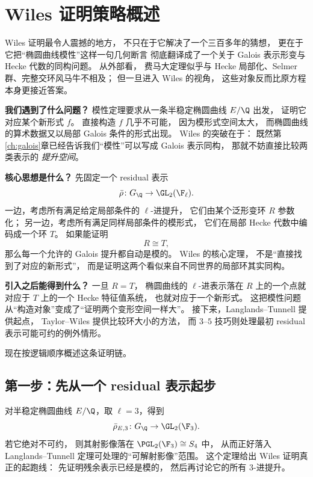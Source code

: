 \section{Wiles 证明策略概述}
\label{sec:ch10-wiles-strategy}

\providecommand{\rhobar}{\bar{\rho}}
\providecommand{\Sel}{\operatorname{Sel}}

Wiles 证明最令人震撼的地方，
不只在于它解决了一个三百多年的猜想，
更在于它把“椭圆曲线模性”这样一句几何断言
彻底翻译成了一个关于 Galois 表示形变与 Hecke 代数的同构问题。
从外部看，
费马大定理似乎与 Hecke 局部化、Selmer 群、完整交环风马牛不相及；
但一旦进入 Wiles 的视角，
这些对象反而比原方程本身更接近答案。

\textbf{我们遇到了什么问题？}
模性定理要求从一条半稳定椭圆曲线 $E/\Q$ 出发，
证明它对应某个新形式 $f$。
直接构造 $f$ 几乎不可能，
因为模形式空间太大，
而椭圆曲线的算术数据又以局部 Galois 条件的形式出现。
Wiles 的突破在于：
既然第\ref{ch:galois}章已经告诉我们“模性”可以写成 Galois 表示同构，
那就不妨直接比较两类表示的 \emph{提升空间}。

\textbf{核心思想是什么？}
先固定一个 residual 表示
\[
  \rhobar\colon G_\Q\to \GL_2(\F_\ell).
\]
一边，考虑所有满足给定局部条件的 $\ell$-进提升，
它们由某个泛形变环 $R$ 参数化；
另一边，考虑所有满足同样局部条件的模形式，
它们在局部 Hecke 代数中编码成一个环 $T$。
如果能证明
\[
  R\cong T,
\]
那么每一个允许的 Galois 提升都自动是模的。
Wiles 的核心定理，
不是“直接找到了对应的新形式”，
而是证明这两个看似来自不同世界的局部环其实同构。

\textbf{引入之后能得到什么？}
一旦 $R=T$，
椭圆曲线的 $\ell$-进表示落在 $R$ 上的一个点就对应于 $T$ 上的一个 Hecke 特征值系统，
也就对应于一个新形式。
这把模性问题从“构造对象”变成了“证明两个变形空间一样大”。
接下来，Langlands--Tunnell 提供起点，
Taylor--Wiles 提供比较环大小的方法，
而 $3$--$5$ 技巧则处理最初 residual 表示可能可约的例外情形。



现在按逻辑顺序概述这条证明链。

\subsection*{第一步：先从一个 residual 表示起步}
对半稳定椭圆曲线 $E/\Q$，取 $\ell=3$，得到
\[
  \rhobar_{E,3}\colon G_\Q\to \GL_2(\F_3).
\]
若它绝对不可约，
则其射影像落在 $\PGL_2(\F_3)\cong S_4$ 中，
从而正好落入 Langlands--Tunnell 定理可处理的“可解射影像”范围。
这个定理给出 Wiles 证明真正的起跑线：
先证明残余表示已经是模的，
然后再讨论它的所有 $3$-进提升。

